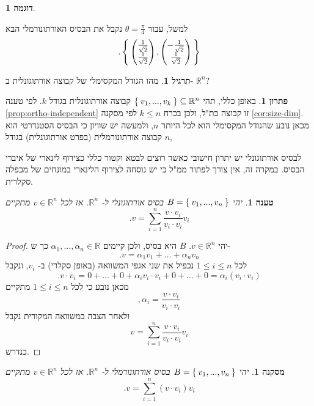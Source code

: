\documentclass[12pt]{report}
\theoremstyle{plain}
\newtheorem{proposition}[theorem]{טענה}
\newtheorem{corollary}[theorem]{מסקנה}
\theoremstyle{definition}
\newtheorem{example}{דוגמה}[chapter]
\newtheorem{exercise}{תרגיל}[chapter]
\newtheorem*{solution}{פתרון}
\newcommand{\R}{\mathbb{R}}
\newcommand{\0}{\mathbf{0}}
\begin{document}
\begin{example}
\begin{enumerate}[label=\alph*.]
למשל, עבור 
$\theta=\frac{\pi}{4}$
נקבל את הבסיס האורתונורמלי הבא
$$
.\Set{\begin{pmatrix}
\frac{1}{\sqrt{2}} \\
\frac{1}{\sqrt{2}}
\end{pmatrix},\begin{pmatrix}
-\frac{1}{\sqrt{2}} \\
\frac{1}{\sqrt{2}}
\end{pmatrix}}
$$

\end{enumerate}
\end{example}

\begin{exercise}
מהו הגודל המקסימלי של קבוצה אורתוגונלית ב-
$\R^n$?
\end{exercise}

\begin{solution}
באופן כללי, תהי
$\Set{v_1,...,v_k}\subseteq\R^n$
קבוצה אורתוגונלית בגודל
$k$.
לפי טענה
\ref{prop:ortho-independent}
זו קבוצה בת"ל, ולכן בכרח
$k\leq n$
לפי מסקנה
\ref{cor:size-dim}.
מכאן נובע שהגודל המקסימלי הוא לכל היותר 
$n$,
ולמעשה יש שוויון כי הבסיס הסטנדרטי הוא קבוצה אורתונורמלית (בפרט אורתוגונלית) בגודל
$n$,
\end{solution}

לבסיס אורתוגונלי יש יתרון חישובי כאשר רוצים לבטא וקטור כללי כצירוף לינארי של איברי הבסיס. במקרה זה, אין צורך לפתור ממ"ל כי יש נוסחה לצירוף הלינארי במונחים של מכפלה סקלרית.

\begin{proposition}\label{prop:ortho-basis}
יהי 
$B=\Set{v_1,...,v_n}$
בסיס אורתוגונלי ל-
$\R^n$.
אז לכל
$v\in\R^n$
מתקיים
$$
.v=\sum_{i=1}^n\frac{v\cdot v_i}{v_i\cdot v_i}v_i
$$
\end{proposition}

\begin{proof}
יהי
$v\in\R^n$.
$B$
היא בסיס, ולכן קיימים 
$\alpha_1,...,\alpha_n\in\R$
כך ש-
$$
.v=\alpha_1 v_1+...+\alpha_n v_n
$$
לכל
$1\leq i\leq n$
נכפיל את שני אגפי המשוואה (באופן סקלרי) ב-
$v_i$,
ונקבל
$$
.v\cdot v_i=0+...+0+\alpha_iv_i\cdot v_i+0+...+0=\alpha_i(v_i\cdot v_i)
$$
מכאן נובע כי לכל
$1\leq i\leq n$
מתקיים
$$
,\alpha_i=\frac{v\cdot v_i}{v_i\cdot v_i}
$$
ולאחר הצבה במשוואה המקורית נקבל
$$
v=\sum_{i=1}^n\frac{v\cdot v_i}{v_i\cdot v_i}v_i
$$
כנדרש.
\end{proof}

\begin{corollary}\label{cor:orthonormal}
יהי 
$B=\Set{v_1,...,v_n}$
בסיס אורתונורמלי ל-
$\R^n$.
אז לכל
$v\in\R^n$
מתקיים
$$
.v=\sum_{i=1}^n(v\cdot v_i)v_i
$$
\end{corollary}
\end{document}

